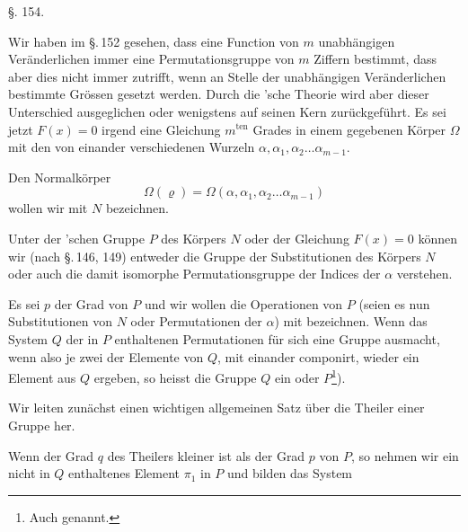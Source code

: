 \begin{center}
\S. 154.\\[4pt]
\end{center}

Wir haben im \S.\,152 gesehen, dass eine Function von $m$ unabh\"angigen Ver\"anderlichen immer eine Permutationsgruppe von $m$ Ziffern bestimmt, dass aber dies nicht immer zutrifft, wenn an Stelle der unabh\"angigen Ver\"anderlichen bestimmte Gr\"ossen gesetzt werden. Durch die 'sche Theorie wird aber dieser Unterschied ausgeglichen oder wenigstens auf seinen Kern zur\"uckgef\"uhrt. Es sei jetzt $F(x) = 0$ irgend eine Gleichung $m^{\text{ten}}$ Grades in einem gegebenen K\"orper $\Omega$ mit den von einander verschiedenen Wurzeln $\alpha, \alpha_1, \alpha_2 \ldots \alpha_{m-1}$.

Den Normalk\"orper
\[
\Omega(\varrho) = \Omega(\alpha, \alpha_1, \alpha_2 \ldots \alpha_{m-1})
\]
wollen wir mit $N$ bezeichnen.

Unter der 'schen Gruppe $P$ des K\"orpers $N$ oder der Gleichung $F(x) = 0$ k\"onnen wir (nach \S.\,146, 149) entweder die Gruppe der Substitutionen des K\"orpers $N$ oder auch die damit isomorphe Permutationsgruppe der Indices der $\alpha$ verstehen.

Es sei $p$ der Grad von $P$ und wir wollen die Operationen von $P$ (seien es nun Substitutionen von $N$ oder Permutationen der $\alpha$) mit
bezeichnen. Wenn das System $Q$ der in $P$ enthaltenen Permutationen
f\"ur sich eine Gruppe ausmacht, wenn also je zwei der Elemente von $Q$, mit einander componirt, wieder ein Element aus $Q$ ergeben, so heisst die Gruppe $Q$ ein  oder  $P$\footnote{Auch  genannt.}).

Wir leiten zun\"achst einen wichtigen allgemeinen Satz \"uber die Theiler einer Gruppe her.

Wenn der Grad $q$ des Theilers kleiner ist als der Grad $p$ von $P$, so nehmen wir ein nicht in $Q$ enthaltenes Element $\pi_1$ in $P$ und bilden das System
